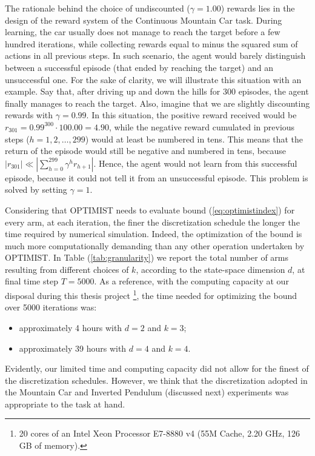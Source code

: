 \begin{remark} \label{rk:undiscounted}
The rationale behind the choice of undiscounted ($\gamma=1.00$) rewards lies in the design of the reward system of the Continuous Mountain Car task. During learning, the car usually does not manage to reach the target before a few hundred iterations, while collecting rewards equal to minus the squared sum of actions in all previous steps. In such scenario, the agent would barely distinguish between a successful episode (that ended by reaching the target) and an unsuccessful one. For the sake of clarity, we will illustrate this situation with an example. Say that, after driving up and down the hills for 300 episodes, the agent finally manages to reach the target. Also, imagine that we are slightly discounting rewards with $\gamma=0.99$. In this situation, the positive reward received would be $r_{301}=0.99^{300}\cdot 100.00=4.90$, while the negative reward cumulated in previous steps ($h=1,2,\dots,299$) would at least be numbered in tens. This means that the return of the episode would still be negative and numbered in tens, because $|r_{301}|\ll |\sum_{h=0}^{299}\gamma^hr_{h+1}|$. Hence, the agent would not learn from this successful episode, because it could not tell it from an unsuccessful episode. This problem is solved by setting $\gamma=1$.
\end{remark}

\begin{remark} \label{rk:discretization}
Considering that \gls{OPTIMIST} needs to evaluate bound (\ref{eq:optimistindex}) for every arm, at each iteration, the finer the discretization schedule the longer the time required by numerical simulation. Indeed, the optimization of the bound is much more computationally demanding than any other operation undertaken by \gls{OPTIMIST}. In Table (\ref{tab:granularity}) we report the total number of arms resulting from different choices of $k$, according to the state-space dimension $d$, at final time step $T=5000$. As a reference, with the computing capacity at our disposal during this thesis project \footnote{20 cores of an Intel Xeon Processor E7-8880 v4 (55M Cache, 2.20 GHz, 126 GB of memory).}, the time needed for optimizing the bound over 5000 iterations was:

\begin{itemize}
\item approximately 4 hours with $d=2$ and $k=3$;
\item approximately 39 hours with $d=4$ and $k=4$.
\end{itemize} 

Evidently, our limited time and computing capacity did not allow for the finest of the discretization schedules. However, we think that the discretization adopted in the Mountain Car and Inverted Pendulum (discussed next) experiments was appropriate to the task at hand.
\end{remark}

